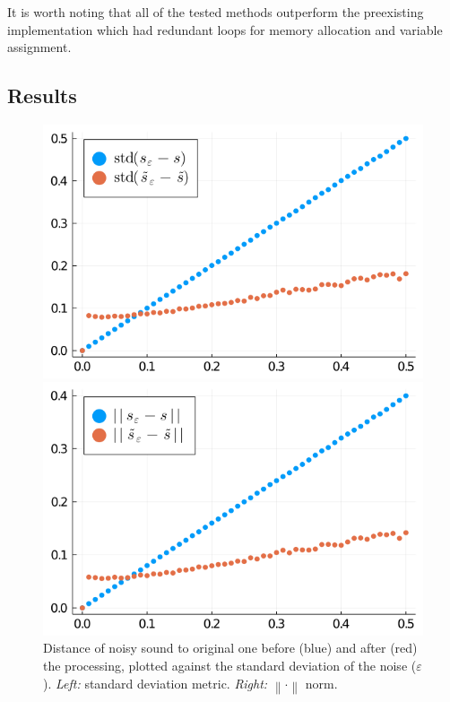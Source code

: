 \documentclass[american,]{article}
\theoremstyle{definition}
\theoremstyle{definition}
\theoremstyle{definition}
\theoremstyle{remark}
\begin{document}
It is worth noting that all of the tested methods outperform
the preexisting implementation which had redundant loops
for memory allocation and variable assignment.

\hypertarget{results}{%
\subsection{Results}\label{results}}

\begin{figure}[H]
    \begin{minipage}{.47\linewidth}
    \centering
    \includegraphics[width=\textwidth]{img/std_diff.png}
    \end{minipage}%
    \hfill
    \begin{minipage}{.47\linewidth}
    \centering
    \includegraphics[width=\textwidth]{img/norm_diff.png}
    \end{minipage}
    \caption{\label{fig:experiments}Distance of noisy sound to original one before (blue) and after (red) the processing, plotted against the standard deviation of the noise ($\varepsilon$). \emph{Left:} standard deviation metric. \emph{Right:} $\left\lVert\cdot\right\rVert$ norm.}
\end{figure}
\end{document}
